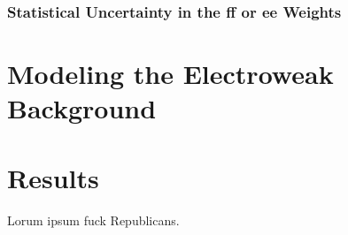 \documentclass[dissertation.tex]{subfiles}
\begin{document}
\subsubsection{Statistical Uncertainty in the ff or ee Weights}
\label{sec:Statistical Uncertainty in the ff or ee Weights}

\section{Modeling the Electroweak Background}
\section{Results}

Lorum ipsum fuck Republicans.
\end{document}
